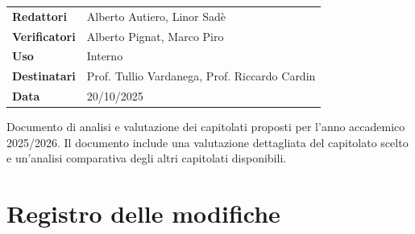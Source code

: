 \documentclass[a4paper,11pt]{article}
\begin{document}
\begin{center}
\begin{tcolorbox}[colback=lightgray,colframe=primaryblue,width=0.85\textwidth,arc=3mm,boxrule=0.5pt]
\begin{tabular}{@{}ll@{}}
\textbf{Redattori}    & Alberto Autiero, Linor Sadè\\
\textbf{Verificatori} & Alberto Pignat, Marco Piro \\
\textbf{Uso}          & Interno \\
\textbf{Destinatari}  & Prof. Tullio Vardanega, Prof. Riccardo Cardin \\
\textbf{Data}         & 20/10/2025 \\
\end{tabular}
\end{tcolorbox}
\end{center}

\vspace{0.5cm}

\begin{center}
\begin{tcolorbox}[colback=secondaryblue!10,colframe=secondaryblue,width=0.9\textwidth,arc=3mm,boxrule=0.8pt,title={\bfseries Abstract}]
Documento di analisi e valutazione dei capitolati proposti per l'anno accademico 2025/2026. Il documento include una valutazione dettagliata del capitolato scelto e un'analisi comparativa degli altri capitolati disponibili.
\end{tcolorbox}
\end{center}

\newpage
\section*{Registro delle modifiche}

\setlength{\extrarowheight}{2pt} %
\renewcommand{\arraystretch}{1.5} 
\end{document}
